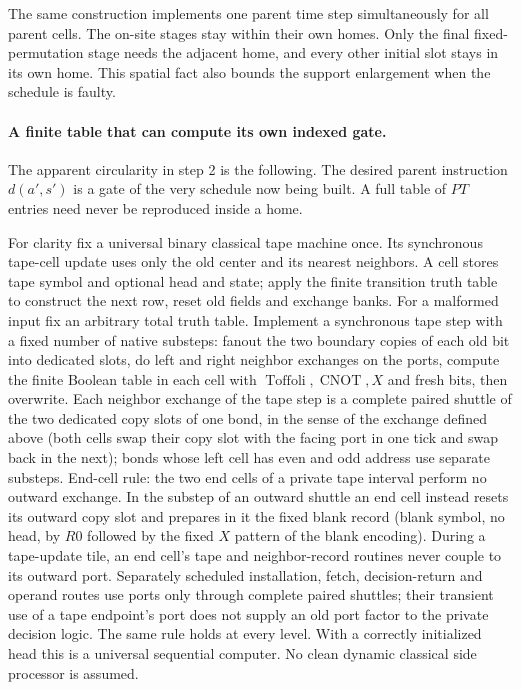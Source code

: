 \begin{enumerate}[label=\arabic*.]
\end{enumerate}

The same construction implements one parent time step simultaneously for all parent cells. The on-site stages stay within their own homes. Only the final fixed-permutation stage needs the adjacent home, and every other initial slot stays in its own home. This spatial fact also bounds the support enlargement when the schedule is faulty.

\paragraph{A finite table that can compute its own indexed gate.}

The apparent circularity in step 2 is the following. The desired parent instruction \(d(a',s')\) is a gate of the very schedule now being built. A full table of \(P T\) entries need never be reproduced inside a home.

For clarity fix a universal binary classical tape machine once. Its synchronous tape-cell update uses only the old center and its nearest neighbors. A cell stores tape symbol and optional head and state; apply the finite transition truth table to construct the next row, reset old fields and exchange banks. For a malformed input fix an arbitrary total truth table. Implement a synchronous tape step with a fixed number of native substeps: fanout the two boundary copies of each old bit into dedicated slots, do left and right neighbor exchanges on the ports, compute the finite Boolean table in each cell with \(\operatorname{Toffoli}, \operatorname{CNOT}, X\) and fresh bits, then overwrite. Each neighbor exchange of the tape step is a complete paired shuttle of the two dedicated copy slots of one bond, in the sense of the exchange defined above (both cells swap their copy slot with the facing port in one tick and swap back in the next); bonds whose left cell has even and odd address use separate substeps. End-cell rule: the two end cells of a private tape interval perform no outward exchange. In the substep of an outward shuttle an end cell instead resets its outward copy slot and prepares in it the fixed blank record (blank symbol, no head, by \(R0\) followed by the fixed \(X\) pattern of the blank encoding). During a tape-update tile, an end cell's tape and neighbor-record routines never couple to its outward port. Separately scheduled installation, fetch, decision-return and operand routes use ports only through complete paired shuttles; their transient use of a tape endpoint's port does not supply an old port factor to the private decision logic. The same rule holds at every level. With a correctly initialized head this is a universal sequential computer. No clean dynamic classical side processor is assumed.

